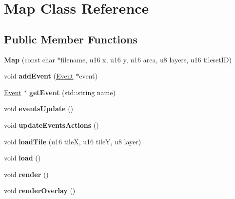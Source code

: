 \hypertarget{classMap}{\section{Map Class Reference}
\label{classMap}
}
\subsection*{Public Member Functions}
\begin{DoxyCompactItemize}
\item 
\hypertarget{classMap_a6bfec37d904bae26aa1a49d528389121}{{\bfseries Map} (const char $\ast$filename, u16 x, u16 y, u16 area, u8 layers, u16 tileset\-I\-D)}\label{classMap_a6bfec37d904bae26aa1a49d528389121}

\item 
\hypertarget{classMap_a00f29ed598774748bd9bf9f15b83d082}{void {\bfseries add\-Event} (\hyperlink{classEvent}{Event} $\ast$event)}\label{classMap_a00f29ed598774748bd9bf9f15b83d082}

\item 
\hypertarget{classMap_a69acc89957368e48c787a40f57fdb8ab}{\hyperlink{classEvent}{Event} $\ast$ {\bfseries get\-Event} (std\-::string name)}\label{classMap_a69acc89957368e48c787a40f57fdb8ab}

\item 
\hypertarget{classMap_a4ade1cf1f93b3de60ffdda3d9aa94bfa}{void {\bfseries events\-Update} ()}\label{classMap_a4ade1cf1f93b3de60ffdda3d9aa94bfa}

\item 
\hypertarget{classMap_a76acda70e2e2ff4392afa92afaa1cc06}{void {\bfseries update\-Events\-Actions} ()}\label{classMap_a76acda70e2e2ff4392afa92afaa1cc06}

\item 
\hypertarget{classMap_acc6cc4b358540c463100efad99a85ddd}{void {\bfseries load\-Tile} (u16 tile\-X, u16 tile\-Y, u8 layer)}\label{classMap_acc6cc4b358540c463100efad99a85ddd}

\item 
\hypertarget{classMap_a11fd1b88b5f3c923dad2c88df16e4373}{void {\bfseries load} ()}\label{classMap_a11fd1b88b5f3c923dad2c88df16e4373}

\item 
\hypertarget{classMap_a3be698445324a0d0e18b49d0730b9bea}{void {\bfseries render} ()}\label{classMap_a3be698445324a0d0e18b49d0730b9bea}

\item 
\hypertarget{classMap_adae49f3de52f3e48771b490ab929149a}{void {\bfseries render\-Overlay} ()}\label{classMap_adae49f3de52f3e48771b490ab929149a}


\end{DoxyCompactItemize}
